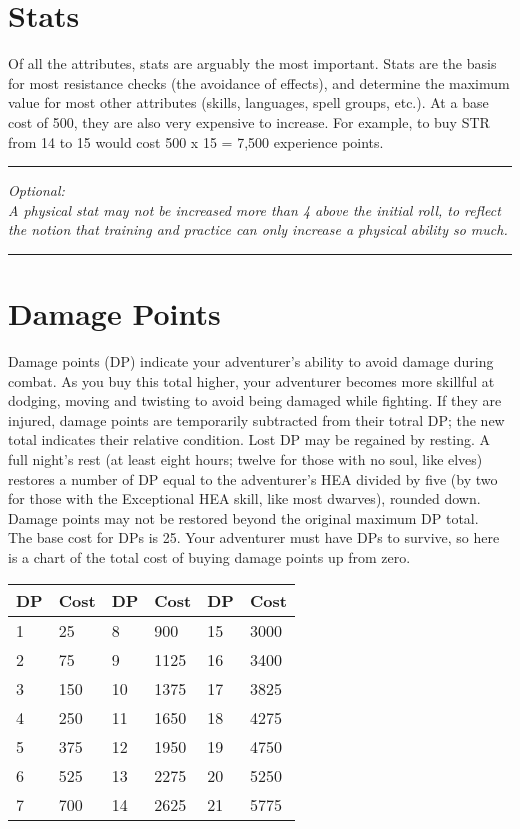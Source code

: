 \begin{multicols}{2}
\section{Stats}
Of all the attributes, stats are arguably the most important. Stats are the basis for most resistance checks (the avoidance of effects), and determine the maximum value for most other attributes (skills, languages, spell groups, etc.). At a base cost of 500, they are also very expensive to increase. For example, to buy STR from 14 to 15 would cost 500 x 15 = 7,500 experience points.
\hrule
\textit{Optional:\\
A physical stat may not be increased more than 4 above the initial roll, to reflect the notion that training and practice can only increase a physical ability so much.}
\hrule
\section{Damage Points}
Damage points (DP) indicate your adventurer's ability to avoid damage during combat. As you buy this total higher, your adventurer becomes more skillful at dodging, moving and twisting to avoid being damaged while fighting. If they are injured, damage points are temporarily subtracted from their totral DP; the new total indicates their relative condition.
Lost DP may be regained by resting. A full night’s rest (at least eight hours; twelve for those with no soul, like elves) restores a number of DP equal to the adventurer’s HEA divided by five (by two for those with the Exceptional HEA skill, like most dwarves), rounded down. Damage points may not be restored beyond the original maximum DP total. \\
The base cost for DPs is 25. Your adventurer must have DPs to survive, so here is a chart of the total cost of buying damage points up from zero.

\begin{tcolorbox}[breakable,boxrule=0pt]
\begin{tabular}{l l|l l|l l}
DP & Cost & DP & Cost & DP & Cost\\
\midrule
1 & 25 & 8 & 900 & 15 & 3000\\
2 & 75 & 9 & 1125 & 16 & 3400\\
3 & 150 & 10 & 1375 & 17 & 3825\\
4 & 250 & 11 & 1650 & 18 & 4275\\
5 & 375 & 12 & 1950 & 19 & 4750\\
6 & 525 & 13 & 2275 & 20 & 5250\\
7 & 700 & 14 & 2625 & 21 & 5775\\
\end{tabular}
\end{tcolorbox}


\end{multicols}

